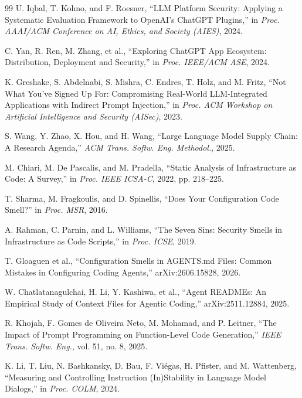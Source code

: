 \documentclass[conference]{IEEEtran}
\begin{document}
\begin{thebibliography}{99}
U. Iqbal, T. Kohno, and F. Roesner, ``LLM Platform Security: Applying a
Systematic Evaluation Framework to OpenAI's ChatGPT Plugins,'' in \emph{Proc.
AAAI/ACM Conference on AI, Ethics, and Society (AIES)}, 2024.

C. Yan, R. Ren, M. Zhang, et al., ``Exploring ChatGPT App Ecosystem:
Distribution, Deployment and Security,'' in \emph{Proc. IEEE/ACM ASE}, 2024.

K. Greshake, S. Abdelnabi, S. Mishra, C. Endres, T. Holz, and M. Fritz, ``Not
What You've Signed Up For: Compromising Real-World LLM-Integrated Applications
with Indirect Prompt Injection,'' in \emph{Proc. ACM Workshop on Artificial
Intelligence and Security (AISec)}, 2023.

S. Wang, Y. Zhao, X. Hou, and H. Wang, ``Large Language Model Supply Chain: A
Research Agenda,'' \emph{ACM Trans. Softw. Eng. Methodol.}, 2025.

M. Chiari, M. De Pascalis, and M. Pradella, ``Static Analysis of Infrastructure
as Code: A Survey,'' in \emph{Proc. IEEE ICSA-C}, 2022, pp. 218--225.

T. Sharma, M. Fragkoulis, and D. Spinellis, ``Does Your Configuration Code
Smell?'' in \emph{Proc. MSR}, 2016.

A. Rahman, C. Parnin, and L. Williams, ``The Seven Sins: Security Smells in
Infrastructure as Code Scripts,'' in \emph{Proc. ICSE}, 2019.

T. Gloaguen et al., ``Configuration Smells in AGENTS.md Files: Common Mistakes
in Configuring Coding Agents,'' arXiv:2606.15828, 2026.

W. Chatlatanagulchai, H. Li, Y. Kashiwa, et al., ``Agent READMEs: An Empirical
Study of Context Files for Agentic Coding,'' arXiv:2511.12884, 2025.

R. Khojah, F. Gomes de Oliveira Neto, M. Mohamad, and P. Leitner, ``The Impact
of Prompt Programming on Function-Level Code Generation,'' \emph{IEEE Trans.
Softw. Eng.}, vol. 51, no. 8, 2025.

K. Li, T. Liu, N. Bashkansky, D. Bau, F. Vi\'egas, H. Pfister, and
M. Wattenberg, ``Measuring and Controlling Instruction (In)Stability in Language
Model Dialogs,'' in \emph{Proc. COLM}, 2024.


\end{thebibliography}
\end{document}
